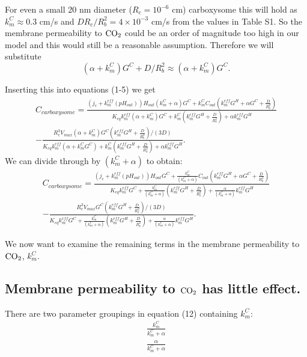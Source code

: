 \documentclass[]{article}
\begin{document}
For even a small 20 nm diameter ($R_c = 10^{-6}$ cm) carboxysome this will hold as $k_m^C \approx 0.3 $ cm/s and $D R_c/R_b^2 = 4 \times 10^{-3}$ cm/s from the values in Table S1. So the membrane permeability to ${\rm CO_2}$ could be an order of magnitude too high in our model and this would still be a reasonable assumption. Therefore we will substitute 
\begin{equation}
(\alpha + k_m^C)G^C + D/R_b^2 \approx (\alpha + k_m^C)G^C.
\end{equation}

Inserting this into equations (1-5) we get
\begin{multline}
C_{carboxysome} = \frac{(j_c+k_m^{eff}(pH_{out}))H_{out}(k_m^C+\alpha)G^C 
	+ k_m^C C_{out} (k_m^{eff} G^H +\alpha G^C+\frac{D}{R_b^2})}
{K_{eq} k_m^{eff}(\alpha+ k_m^C)G^C 
	 + k_m^C\left(k_m^{eff} G^H + \frac{D}{R_b^2}\right) + \alpha k_m^{eff} G^H} \\
-\frac{R_c^3 V_{max}(\alpha + k_m^C)G^C(k_m^{eff} G^H + \frac{D}{R_b^2})/(3D)}
{ K_{eq} k_m^{eff} \left(\alpha+ k_m^C G^C\right) 
	+ k_m^C\left(k_m^{eff} G^H + \frac{D}{R_b^2}\right) + \alpha k_m^{eff} G^H}.
\end{multline}
We can divide through by  $(k_m^C+\alpha)$ to obtain:
\begin{multline}
	C_{carboxysome} = \frac{(j_c+k_m^{eff}(pH_{out}))H_{out}G^C + \frac{k_m^C}{(k_m^C+\alpha)} C_{out} (k_m^{eff} G^H +\alpha G^C+\frac{D}{R_b^2})}
	{K_{eq} k_m^{eff} G^C  
		+\frac{k_m^C}{(k_m^C+\alpha)} \left(k_m^{eff} G^H + \frac{D}{R_b^2}\right) 
		+ \frac{\alpha}{(k_m^C+\alpha)}  k_m^{eff} G^H} \\
	-\frac{R_c^3 V_{max}G^C(k_m^{eff} G^H + \frac{D}{R_b^2})/(3D)}
	{ K_{eq} k_m^{eff} G^C + \frac{k_m^C}{(k_m^C+\alpha)}\left(k_m^{eff} G^H + \frac{D}{R_b^2}\right) 
		+ \frac{\alpha}{(k_m^C+\alpha)} k_m^{eff} G^H}.
\end{multline}

We now want to examine the remaining terms in the membrane permeability to ${\rm CO_2}$, $k_m^C$.

\subsection{Membrane permeability to ${\rm CO_2}$ has little effect.}
There are two parameter groupings in equation (12) containing $k_m^C$:
\begin{eqnarray}
\frac{k_m^C}{k_m^C + \alpha}\\
\frac{\alpha}{k_m^C + \alpha}
\end{eqnarray}
\end{document}
